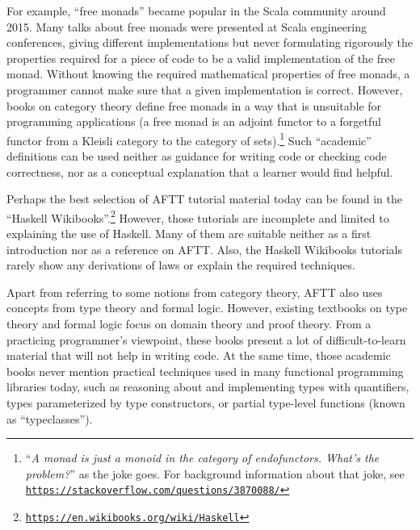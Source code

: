 For example, \textsf{``}free monads\textsf{''} became popular in the Scala community
around 2015. Many talks about free monads were presented at Scala
engineering conferences, giving different implementations but never
formulating rigorously the properties required for a piece of code
to be a valid implementation of the free monad. Without knowing the
required mathematical properties of free monads, a programmer cannot
make sure that a given implementation is correct. However, books on
category theory define free monads in a way that is unsuitable for
programming applications (a free monad is an adjoint functor to a
forgetful functor from a Kleisli category to the category of sets).\footnote{\textsf{``}\emph{A monad is just a monoid in the category of endofunctors.
What\textsf{'}s the problem?}\textsf{''} as the joke goes. For background information
about that joke, see \texttt{\href{https://stackoverflow.com/questions/3870088/}{https://stackoverflow.com/questions/3870088/}}} Such \textsf{``}academic\textsf{''} definitions can be used neither as guidance for
writing code or checking code correctness, nor as a conceptual explanation
that a learner would find helpful.

Perhaps the best selection of AFTT tutorial material today can be
found in the \textsf{``}Haskell Wikibooks\textsf{''}.\footnote{\texttt{\href{https://en.wikibooks.org/wiki/Haskell}{https://en.wikibooks.org/wiki/Haskell}}}
However, those tutorials are incomplete and limited to explaining
the use of Haskell. Many of them are suitable neither as a first introduction
nor as a reference on AFTT. Also, the Haskell Wikibooks tutorials
rarely show any derivations of laws or explain the required techniques.

Apart from referring to some notions from category theory, AFTT also
uses concepts from type theory and formal logic. However, existing
textbooks on type theory and formal logic focus on domain theory and
proof theory. From a practicing programmer\textsf{'}s viewpoint, these books
present a lot of difficult-to-learn material that will not help in
writing code. At the same time, those academic books never mention
practical techniques used in many functional programming libraries
today, such as reasoning about and implementing types with quantifiers,
types parameterized by type constructors, or partial type-level functions
(known as \textsf{``}typeclasses\textsf{''}).

